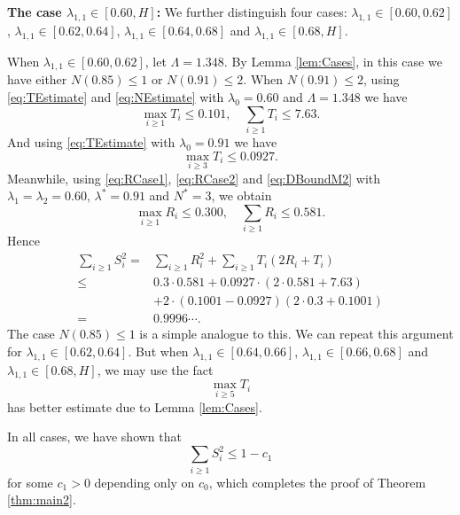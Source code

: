 \documentclass[10pt, reqno]{amsart}
\numberwithin{equation}{section}
\def\beq{\begin{equation}}
\def\eeq{\end{equation}}
\begin{document}
\textbf{The case $\lambda_{1,1}\in [0.60,H]$:}
We further distinguish four cases: $\lambda_{1,1}\in [0.60,0.62]$, $\lambda_{1,1}\in [0.62,0.64]$, $\lambda_{1,1}\in [0.64,0.68]$ and $\lambda_{1,1}\in [0.68,H]$.

When $\lambda_{1,1}\in [0.60,0.62]$, let $\Lambda=1.348$. By Lemma \ref{lem:Cases}, in this case we have either $N(0.85)\leq 1$ or $N(0.91)\leq 2$. When $N(0.91)\leq 2$, using \eqref{eq:TEstimate} and \eqref{eq:NEstimate} with $\lambda_0=0.60$ and $\Lambda=1.348$ we have
\begin{equation}\label{eq:TiCase4}
\max_{i\geq 1} T_i\leq 0.101,\quad \sum_{i\geq 1}T_i\leq 7.63.
\end{equation}
And using \eqref{eq:TEstimate} with $\lambda_0=0.91$ we have
\begin{equation}\label{eq:TiLargeCase4}
\max_{i\geq 3} T_i\leq 0.0927.
\end{equation}
Meanwhile, using \eqref{eq:RCase1}, \eqref{eq:RCase2} and \eqref{eq:DBoundM2} with $\lambda_1=\lambda_2=0.60$, $\lambda^*=0.91$ and $N^*=3$, we obtain
\begin{equation}\label{eq:RiCase4}
\max_{i\geq 1} R_i\leq 0.300,\quad \sum_{i\geq 1}R_i\leq 0.581.
\end{equation}
Hence
\begin{equation}\label{eq:FinalCase4}
\begin{split}
\sum_{i\geq 1}S_i^2=&\sum_{i\geq 1}R_i^2+\sum_{i\geq1} T_i(2R_i+T_i) \\
\leq &0.3\cdot 0.581+0.0927\cdot (2\cdot 0.581+7.63) \\
&+2\cdot (0.1001-0.0927)(2\cdot 0.3+0.1001) \\
=&0.9996\cdots.
\end{split}
\end{equation}
The case $N(0.85)\leq 1$ is a simple analogue to this. We can repeat this argument for $\lambda_{1,1}\in [0.62,0.64]$. But when $\lambda_{1,1}\in [0.64,0.66]$, $\lambda_{1,1}\in [0.66,0.68]$ and $\lambda_{1,1}\in [0.68,H]$, we may use the fact
\begin{equation}\label{eq:MaxTiLarge}
\max_{i\geq 5}T_i
\end{equation}
has better estimate due to Lemma \ref{lem:Cases}.

In all cases, we have shown that 
\beq
 \sum_{i\geq 1}S_i^2\leq 1-c_1
\eeq for some $c_1>0$ depending only on $c_0$, which completes the proof of Theorem \ref{thm:main2}.
\end{document}
